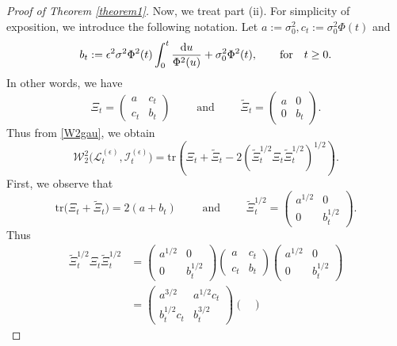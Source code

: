 \documentclass[12pt,thmsa]{article}
\begin{document}
\begin{proof}[Proof of Theorem \ref{theorem1}]
	Now, we treat part (ii). For simplicity of exposition,  we introduce the following notation. Let $a:=\sigma_0^2, c_t:=\sigma_0^2\Phi(t)$ and 
	\begin{equation}\label{notpartii}
		b_t:=\epsilon^2\sigma^2\Phi^2(t)\int_0^{ t}\frac{{\rm d}u}{\Phi^2(u)}+\sigma_0^2\Phi^2(t), \qquad \textrm{for}\quad t\ge 0.
	\end{equation}
	In other words, we have
	\begin{equation}\label{matrices}
		\Xi_t =\begin{pmatrix}
			a & c_t\\
			c_t & b_t
		\end{pmatrix} \qquad\textrm{ and }\qquad\widetilde{\Xi}_t =\begin{pmatrix}
			a & 0\\
			0 & b_t
		\end{pmatrix}.
	\end{equation}
	Thus from \eqref{W2gau}, we obtain
	\[
	\mathcal{W}^2_2\Big(\mathcal{L}^{(\epsilon)}_{t},\mathcal{I}^{(\epsilon)}_{t}\Big)=\mathrm{tr}\left(\Xi_t+\widetilde{\Xi}_t-2\left(\widetilde{\Xi}^{1/2}_t\Xi_t\widetilde{\Xi}_t^{1/2}\right)^{1/2}\right).
	\]
	First, we observe that 
	\[
	\mathrm{tr}\Big(\Xi_t+\widetilde{\Xi}_t\Big)=2(a+b_t) \qquad \textrm{ and }\qquad \widetilde{\Xi}^{1/2}_t =\begin{pmatrix}
		a^{1/2} & 0\\
		0 & b^{1/2}_t
	\end{pmatrix}.
	\]
	Thus
	\begin{equation}\label{tomate}
		\begin{split}
			\widetilde{\Xi}_t^{1/2}\Xi_t\widetilde{\Xi}_t^{1/2}&=\begin{pmatrix}
				a^{1/2} & 0\\
				0 & b^{1/2}_t
			\end{pmatrix}
			\begin{pmatrix}
				a & c_t\\
				c_t & b_t
			\end{pmatrix}
			\begin{pmatrix}
				a^{1/2} & 0\\
				0 & b^{1/2}_t
			\end{pmatrix}\\
			&=\begin{pmatrix}
				a^{3/2} & a^{1/2}c_t\\
				b^{1/2}_tc_t & b^{3/2}_t
			\end{pmatrix}
			\begin{pmatrix}

\end{pmatrix}
\end{split}
\end{equation}
\end{proof}
\end{document}

